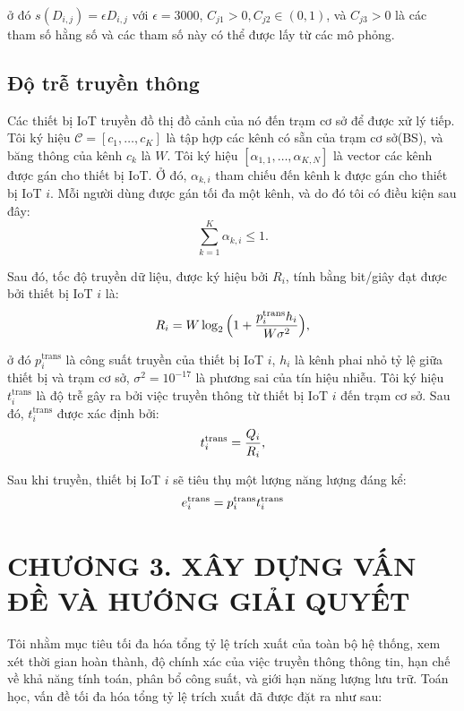 \documentclass{article} %
\begin{document}
ở đó $s(D_{i,j}) = \epsilon D_{i, j}$ với $\epsilon=3000$, $C_{j 1}>0, C_{j 2} \in(0,1)$, và $C_{j 3}>0$  là các tham số hằng số và các tham số này có thể được lấy từ các mô phỏng.

\subsection{Độ trễ truyền thông}

Các thiết bị IoT truyền đồ thị đồ cảnh của nó đến trạm cơ sở để được xử lý tiếp. Tôi ký hiệu $\mathcal{C}=[c_1,\ldots,c_K]$ là tập hợp các kênh có sẵn của trạm cơ sở(BS), và băng thông của kênh $c_k$ là $W$. Tôi ký hiệu $[\alpha_{1,1},\ldots,\alpha_{K,N}]$ là vector các kênh được gán cho thiết bị IoT. Ở đó, $\alpha_{k,i}$ tham chiếu đến kênh k được gán cho thiết bị IoT $i$. Mỗi người dùng được gán tối đa một kênh, và do đó tôi có điều kiện sau đây:
\begin{equation}
\sum_{k=1}^{K}\alpha_{k,i}\leq 1.
\end{equation}

Sau đó, tốc độ truyền dữ liệu, được ký hiệu bởi $R_i$, tính bằng bit/giây đạt được bởi thiết bị IoT $i$ là:
\begin{equation}
        R_{i} = W\log_2 \Big{(}1+ \frac{p^{\rm{trans}}_{i}h_{i}}{W\sigma^2} \Big{)},
\end{equation}

ở đó $p_i^{\mathrm{trans}}$ là công suất truyền của thiết bị IoT $i$, $h_i$ là kênh phai nhỏ tỷ lệ giữa thiết bị và trạm cơ sở, $\sigma^2={10}^{-17}$ là phương sai của tín hiệu nhiễu. Tôi ký hiệu $t_i^{\mathrm{trans}}$ là độ trễ gây ra bởi việc truyền thông từ thiết bị IoT $i$ đến trạm cơ sở. Sau đó, $t_i^{\mathrm{trans}}$ được xác định bởi:
\begin{equation}
t^{\rm{trans}}_{i}=\frac{Q_{i}}{R_{i}},
\end{equation}

Sau khi truyền, thiết bị IoT $i$ sẽ tiêu thụ một lượng năng lượng đáng kể:
\begin{equation}
    e_i^{\rm{trans}} = p^{\rm{trans}}_{i} t_i^{\rm{trans}}
\end{equation}

\newpage
\section*{CHƯƠNG 3. XÂY DỰNG VẤN ĐỀ VÀ HƯỚNG GIẢI QUYẾT}
\setcounter{section}{3}
\setcounter{subsection}{0}
\setcounter{figure}{0}
\setcounter{table}{0}
\setcounter{equation}{0}
Tôi nhằm mục tiêu tối đa hóa tổng tỷ lệ trích xuất của toàn bộ hệ thống, xem xét thời gian hoàn thành, độ chính xác của việc truyền thông thông tin, hạn chế về khả năng tính toán, phân bổ công suất, và giới hạn năng lượng lưu trữ. Toán học, vấn đề tối đa hóa tổng tỷ lệ trích xuất đã được đặt ra như sau:
\end{document}
